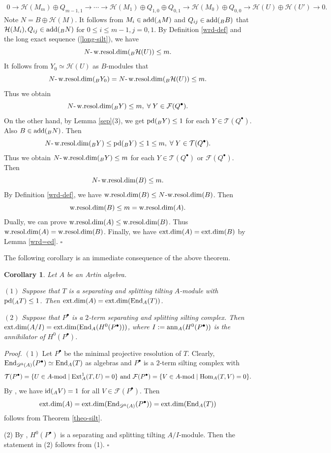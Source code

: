 \documentclass[12pt]{article}
\numberwithin{equation}{section}
\newtheorem{Koro}[Def]{Corollary}
\theoremstyle{definition}
\newcommand{\add}{{\rm add}}
\newcommand{\End}{{\rm End}}
\def\ed{\mathop{\rm ext.dim}\nolimits}
\def\wrd{\mathop{\rm w.resol.dim}\nolimits}
\newcommand{\pd}{{\rm pd}}
\newcommand{\id}{{\rm id}}
\newcommand{\F}{{\mathcal F}}
\def\H{\mathcal{H}}
\newcommand{\T}{{\mathcal T}}
\newcommand{\Db}[1]{{\mathscr D}^b(#1)}
\newcommand{\modcat}{\ensuremath{\mbox{{\rm -mod}}}}
\newcommand{\Hom}{{\rm Hom}}
\newcommand{\Ext}{{\rm Ext}}
\newcommand{\lra}{\longrightarrow}
\begin{document}
\begin{align}\label{long-silt}
0\lra \H(M_m)\oplus Q_{m-1,1}\lra\cdots\lra\H(M_1)\oplus Q_{1,0}\oplus Q_{0,1}\lra \H(M_0)\oplus Q_{0,0}\lra \H(U)\oplus\H(U')\lra 0.
\end{align}
Note $N=B\oplus \H(M)$. It follows from $M_i\in \add(_AM)$ and $Q_{ij}\in \add(_BB)$ that $\H(M_i),Q_{ij}\in \add(_BN)$ for $0\le i\le m-1, j=0,1$. By Definition \ref{wrd-def} and the long exact sequence (\ref{long-silt}), we have $$N\mbox{-}\wrd(_B\H(U))\le m.$$
It follows from $Y_0\simeq \H(U)$ as $B$-modules that $$N\mbox{-}\wrd(_BY_0)= N\mbox{-}\wrd(_B\H(U))\le m.$$
Thus we obtain $$N\mbox{-}\wrd(_BY)\le m,\;\forall\;Y\in \F(Q^{\bullet}).$$
On the other hand, by Lemma \ref{sep}(3), we get $\pd(_BY)\le 1$ for each $Y\in \T(Q^{\bullet})$. Also $B\in\add(_BN)$.
Then $$N\mbox{-}\wrd(_BY)\le \pd(_BY)\le 1\le m,\;\forall \;Y\in \T(Q^{\bullet}).$$
Thus we obtain $N\mbox{-}\wrd(_BY)\le m$ for each $Y\in \T(Q^{\bullet})$ or $\F(Q^{\bullet})$. Then
$$N\mbox{-}\wrd(B)\le m.$$ By Definition \ref{wrd-def}, we have $\wrd(B)\le N$-$\wrd(B)$. Then $$\wrd(B)\le m=\wrd(A).$$ Dually, we can prove $\wrd(A)\le \wrd(B)$. Thus $\wrd(A)=\wrd(B)$.
Finally, we have $\ed(A)=\ed(B)$ by Lemma \ref{wrd=ed}.
$\square$

The following corollary is an immediate consequence of the above theorem.
\begin{Koro} Let $A$ be an Artin algebra.

$(1)$ Suppose that $T$ is a separating and splitting tilting $A$-module with $\pd(_AT)\le 1$. Then $\ed(A)=\ed(\End_A(T))$.

$(2)$ Suppose that $P^{\bullet}$ is a $2$-term separating and splitting silting complex. Then $\ed(A/I) =\ed(\End_A(H^0(P^{\bullet})))$, where $I:={\rm ann}_A(H^0(P^{\bullet}))$ is the annihilator of $H^0(P^{\bullet})$.
\end{Koro}
{\it Proof.} $(1)$ Let $P^{\bullet}$ be the minimal projective resolution of $T$. Clearly, $\End_{\Db{A}}(P^{\bullet})\simeq \End_A(T)$ as algebras and $P^{\bullet}$ is a $2$-term silting complex with $$\T(P^{\bullet})=\{U\in A\modcat\mid \Ext_A^1(T,U)=0\}\mbox{ and }\F(P^{\bullet})=\{V\in A\modcat\mid \Hom_A(T,V)=0\}.$$ By \cite[Theorem 3.6, p. 49]{Assem1990}, we have $\id(_AV)=1$ for all $V\in \F(P^{\bullet})$. Then $$\ed(A)=\ed(\End_{\Db{A}}(P^{\bullet}))=\ed(\End_A(T))$$ follows from Theorem \ref{theo-silt}.

(2) By \cite[Proposition 5.1]{Hu2021}, $H^0(P^{\bullet})$ is a separating and splitting tilting $A/I$-module. Then the statement in (2) follows from (1).
$\square$
\end{document}
